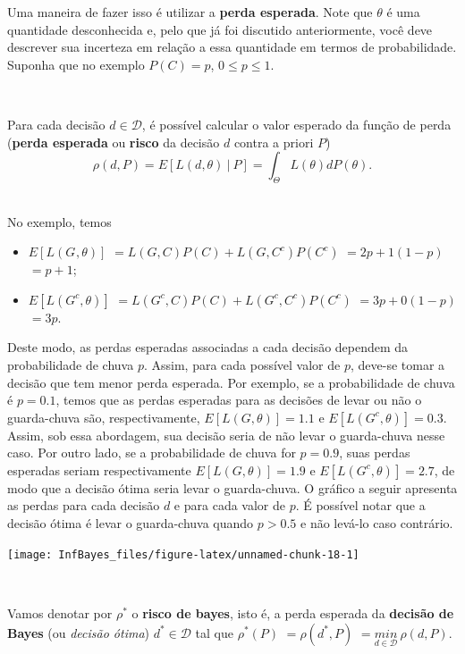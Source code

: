 \documentclass[
]{book}
\begin{document}
Uma maneira de fazer isso é utilizar a \textbf{perda esperada}. Note que \(\theta\) é uma quantidade desconhecida e, pelo que já foi discutido anteriormente, você deve descrever sua incerteza em relação a essa quantidade em termos de probabilidade. Suponha que no exemplo \(P(C)=p\), \(0\leq p\leq 1\).

\(~\)

Para cada decisão \(d \in \mathcal{D}\), é possível calcular o valor esperado da função de perda (\textbf{perda esperada} ou \textbf{risco} da decisão \(d\) contra a priori \(P\))
\[\rho(d,P) = E\left[L(d,\theta) ~|~ P\right] = \int_{\Theta} L(\theta) dP(\theta).\]
\(~\)

No exemplo, temos

\begin{itemize}
\item
  \(E\left[L(G^{},\theta)\right]\) \(=L(G,C)P(C) + L(G,C^c)P(C^c)\) \(=2p+1(1-p)\) \(=p+1\);
\item
  \(E\left[L(G^c,\theta)\right]\) \(=L(G^c,C)P(C) + L(G^c,C^c)P(C^c)\) \(=3p+0(1-p)\) \(=3p\).
\end{itemize}

Deste modo, as perdas esperadas associadas a cada decisão dependem da probabilidade de chuva \(p\). Assim, para cada possível valor de \(p\), deve-se tomar a decisão que tem menor perda esperada. Por exemplo, se a probabilidade de chuva é \(p=0.1\), temos que as perdas esperadas para as decisões de levar ou não o guarda-chuva são, respectivamente, \(E\left[L(G,\theta)\right]=1.1\) e \(E\left[L(G^c,\theta)\right]=0.3\). Assim, sob essa abordagem, sua decisão seria de não levar o guarda-chuva nesse caso. Por outro lado, se a probabilidade de chuva for \(p=0.9\), suas perdas esperadas seriam respectivamente \(E\left[L(G,\theta)\right]=1.9\) e \(E\left[L(G^c,\theta)\right]=2.7\), de modo que a decisão ótima seria levar o guarda-chuva. O gráfico a seguir apresenta as perdas para cada decisão \(d\) e para cada valor de \(p\). É possível notar que a decisão ótima é levar o guarda-chuva quando \(p>0.5\) e não levá-lo caso contrário.

\begin{center}\texttt{[image: InfBayes\_files/figure-latex/unnamed-chunk-18-1]} \end{center}

\(~\)

Vamos denotar por \(\rho^*\) o \textbf{risco de bayes}, isto é, a perda esperada da \textbf{decisão de Bayes} (ou \emph{decisão ótima}) \(d^*\in \mathcal{D}\) tal que \(\rho^*(P)\) \(=\rho(d^*,P)\) \(=\underset{d\in\mathcal{D}}{min}~\rho(d,P)\).
\end{document}
